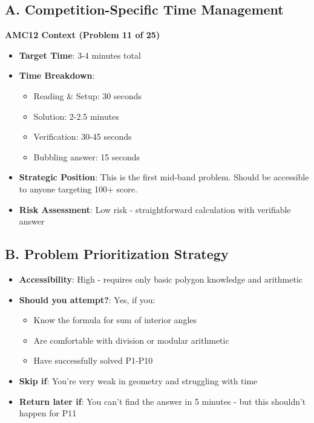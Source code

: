 \documentclass[]{article}
\begin{document}
\begin{competitionbox}
\subsection*{A. Competition-Specific Time Management}

\textbf{AMC12 Context (Problem 11 of 25)}
\begin{itemize}[leftmargin=*]
    \item \textbf{Target Time}: 3-4 minutes total
    \item \textbf{Time Breakdown}:
    \begin{itemize}
        \item Reading \& Setup: 30 seconds
        \item Solution: 2-2.5 minutes
        \item Verification: 30-45 seconds
        \item Bubbling answer: 15 seconds
    \end{itemize}
    \item \textbf{Strategic Position}: This is the first mid-band problem. Should be accessible to anyone targeting 100+ score.
    \item \textbf{Risk Assessment}: Low risk - straightforward calculation with verifiable answer
\end{itemize}

\subsection*{B. Problem Prioritization Strategy}
\begin{itemize}[leftmargin=*]
    \item \textbf{Accessibility}: High - requires only basic polygon knowledge and arithmetic
    \item \textbf{Should you attempt?}: Yes, if you:
    \begin{itemize}
        \item Know the formula for sum of interior angles
        \item Are comfortable with division or modular arithmetic
        \item Have successfully solved P1-P10
    \end{itemize}
    \item \textbf{Skip if}: You're very weak in geometry and struggling with time
    \item \textbf{Return later if}: You can't find the answer in 5 minutes - but this shouldn't happen for P11
\end{itemize}


\end{competitionbox}
\end{document}
